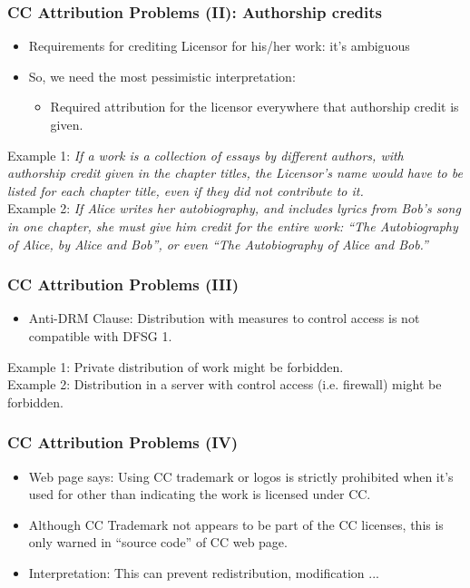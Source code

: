 
\begin{frame}
\frametitle{CC Attribution Problems (II): Authorship credits}

\begin{itemize}
\item Requirements for crediting Licensor for his/her work: it's ambiguous
\item So, we need the most pessimistic interpretation:
\begin{itemize}
\item Required attribution for the licensor everywhere that authorship credit is given.
\end{itemize}
\end{itemize}
Example 1: {\it If a work is a collection of essays by different authors, with authorship credit given in the chapter titles, the Licensor's name would have to be listed for each chapter title, even if they did not contribute to it.}\\
Example 2: {\it If Alice writes her autobiography, and includes lyrics from Bob's song in one chapter, she must give him credit for the entire work: ``The Autobiography of Alice, by Alice and Bob'', or even ``The Autobiography of Alice and Bob.''}
\end{frame}


\begin{frame}
\frametitle{CC Attribution Problems (III)}

\begin{itemize}
\item Anti-DRM Clause: Distribution with measures to control access is not compatible with DFSG 1.
\end{itemize}

Example 1: Private distribution of work might be forbidden.\\
Example 2: Distribution in a server with control access (i.e. firewall) might be forbidden.
\end{frame}


\begin{frame}
\frametitle{CC Attribution Problems (IV)}

\begin{itemize}
\item Web page says: Using CC trademark or logos is strictly prohibited when it's used for other than indicating the work is licensed under CC.
\item Although CC Trademark not appears to be part of the CC licenses, this is only warned in ``source code'' of CC web page.
\item Interpretation: This can prevent redistribution, modification ...
\end{itemize}

\end{frame}

